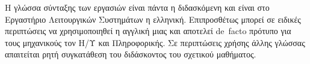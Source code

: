 Η γλώσσα σύνταξης των εργασιών είναι πάντα η διδασκόμενη και είναι στο Εργαστήριο Λειτουργικών Συστημάτων η ελληνική. Επιπροσθέτως μπορεί σε ειδικές περιπτώσεις να χρησιμοποιηθεί η αγγλική μιας και αποτελεί de facto πρότυπο για τους μηχανικούς τον Η/Υ και Πληροφορικής.
Σε περιπτώσεις χρήσης άλλης γλώσσας απαιτείται ρητή συγκατάθεση του διδάσκοντος του σχετικού μαθήματος.
